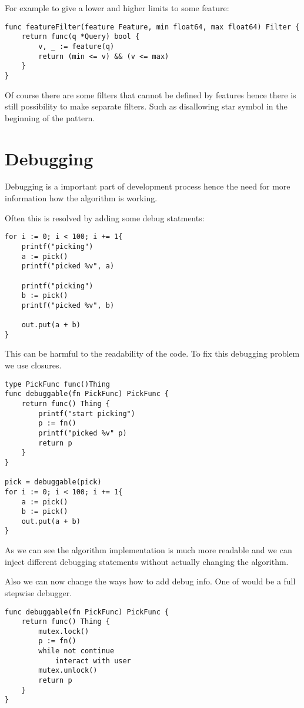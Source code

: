 For example to give a lower and higher limits to some feature:

\begin{verbatim}
func featureFilter(feature Feature, min float64, max float64) Filter {
	return func(q *Query) bool {
		v, _ := feature(q)
		return (min <= v) && (v <= max)
	}
}
\end{verbatim}

Of course there are some filters that cannot be defined by features hence
there is still possibility to make separate filters. Such as disallowing
star symbol in the beginning of the pattern.

\section{Debugging}

Debugging is a important part of development process hence the need for more information how the algorithm is working.

Often this is resolved by adding some debug statments:

\begin{verbatim}
for i := 0; i < 100; i += 1{
	printf("picking")
	a := pick()
	printf("picked %v", a)

	printf("picking")
	b := pick()
	printf("picked %v", b)
	
	out.put(a + b)
}
\end{verbatim}

This can be harmful to the readability of the code. To fix this debugging problem we use closures.

\begin{verbatim}
type PickFunc func()Thing
func debuggable(fn PickFunc) PickFunc {
	return func() Thing {
		printf("start picking")
		p := fn()
		printf("picked %v" p)
		return p
	}
}

pick = debuggable(pick)
for i := 0; i < 100; i += 1{
	a := pick()
	b := pick()
	out.put(a + b)
}
\end{verbatim}

As we can see the algorithm implementation is much more readable and we can inject different debugging statements without actually changing the algorithm.

Also we can now change the ways how to add debug info. One of would be a full stepwise debugger.

\begin{verbatim}
func debuggable(fn PickFunc) PickFunc {
	return func() Thing {
		mutex.lock()
		p := fn()
		while not continue
			interact with user
		mutex.unlock()
		return p
	}
}
\end{verbatim}